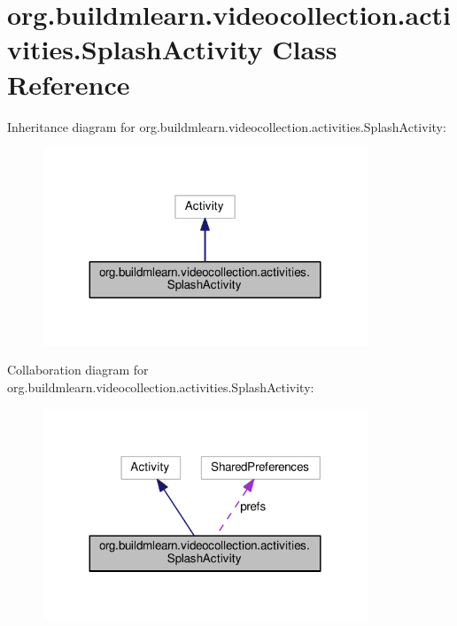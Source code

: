 \hypertarget{classorg_1_1buildmlearn_1_1videocollection_1_1activities_1_1SplashActivity}{}\section{org.\+buildmlearn.\+videocollection.\+activities.\+Splash\+Activity Class Reference}
\label{classorg_1_1buildmlearn_1_1videocollection_1_1activities_1_1SplashActivity}


Inheritance diagram for org.\+buildmlearn.\+videocollection.\+activities.\+Splash\+Activity\+:
\nopagebreak
\begin{figure}[H]
\begin{center}
\leavevmode
\includegraphics[width=275pt]{classorg_1_1buildmlearn_1_1videocollection_1_1activities_1_1SplashActivity__inherit__graph}
\end{center}
\end{figure}


Collaboration diagram for org.\+buildmlearn.\+videocollection.\+activities.\+Splash\+Activity\+:
\nopagebreak
\begin{figure}[H]
\begin{center}
\leavevmode
\includegraphics[width=275pt]{classorg_1_1buildmlearn_1_1videocollection_1_1activities_1_1SplashActivity__coll__graph}
\end{center}
\end{figure}
